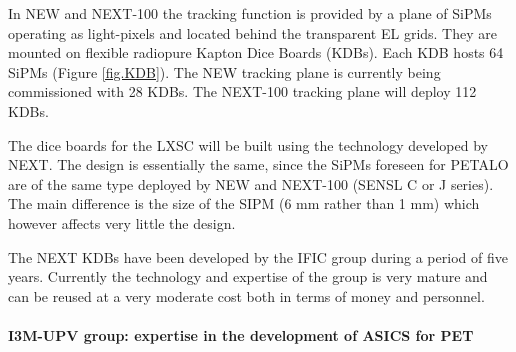 In NEW and NEXT-100 the tracking function is provided by a plane of SiPMs operating as light-pixels and located behind the transparent EL grids. They are mounted on flexible radiopure Kapton Dice Boards (KDBs). Each KDB hosts 64 SiPMs (Figure  \ref{fig.KDB}). The NEW  tracking plane is currently being commissioned with 28 KDBs. The NEXT-100 tracking plane will deploy 112 KDBs.  

The dice boards for the LXSC will be built using the technology developed by NEXT. The design is essentially the same, since the SiPMs foreseen for PETALO are of the same type deployed by NEW and NEXT-100 (SENSL C or J series). The main difference is the size of the SIPM (6 mm rather than 1 mm) which however affects very little the design. 

The NEXT KDBs have been developed by the IFIC group during a period of five years. Currently the technology and expertise of the group is very mature and can be reused at a very moderate cost both in terms of money and personnel. 


\paragraph{I3M-UPV group: expertise in the development of ASICS for PET}

